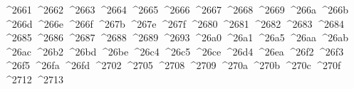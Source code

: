 {  ^^^^2661%
  ^^^^2662%
  ^^^^2663%
  ^^^^2664%
  ^^^^2665%
  ^^^^2666%
  ^^^^2667%
  ^^^^2668%
  ^^^^2669%
  ^^^^266a%
  ^^^^266b%
  ^^^^266d%
  ^^^^266e%
  ^^^^266f%
  ^^^^267b%
  ^^^^267e%
  ^^^^267f%
  ^^^^2680%
  ^^^^2681%
  ^^^^2682%
  ^^^^2683%
  ^^^^2684%
  ^^^^2685%
  ^^^^2686%
  ^^^^2687%
  ^^^^2688%
  ^^^^2689%
  ^^^^2693%
  ^^^^26a0%
  ^^^^26a1%
  ^^^^26a5%
  ^^^^26aa%
  ^^^^26ab%
  ^^^^26ac%
  ^^^^26b2%
  ^^^^26bd%
  ^^^^26be%
  ^^^^26c4%
  ^^^^26c5%
  ^^^^26ce%
  ^^^^26d4%
  ^^^^26ea%
  ^^^^26f2%
  ^^^^26f3%
  ^^^^26f5%
  ^^^^26fa%
  ^^^^26fd%
  ^^^^2702%
  ^^^^2705%
  ^^^^2708%
  ^^^^2709%
  ^^^^270a%
  ^^^^270b%
  ^^^^270c%
  ^^^^270f%
  ^^^^2712%
  ^^^^2713%
}
